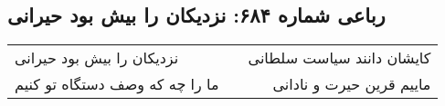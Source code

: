 \begin{center}
\section*{رباعی شماره ۶۸۴: نزدیکان را بیش بود حیرانی}
\label{sec:sh684}
\begin{longtable}{l p{0.5cm} r}
نزدیکان را بیش بود حیرانی
&&
کایشان دانند سیاست سلطانی
\\
ما را چه که وصف دستگاه تو کنیم
&&
ماییم قرین حیرت و نادانی
\\
\end{longtable}
\end{center}
